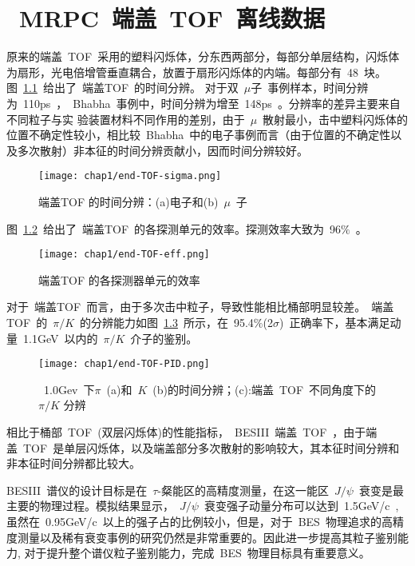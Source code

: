 \chapter{~MRPC~端盖~TOF~离线数据}
原来的端盖~TOF~采用的塑料闪烁体，分东西两部分，每部分单层结构，闪烁体为扇形，光电倍增管垂直耦合，放置于扇形闪烁体的内端。每部分有~48~块。
图~\ref{fig:end-TOF-sigma}~给出了~端盖TOF~的时间分辨。
对于双~$\mu$子~事例样本，时间分辨为~110ps~，~Bhabha~事例中，时间分辨为增至~148ps~\cite{zhaoc:2011}。分辨率的差异主要来自不同粒子与实
验装置材料不同作用的差别，由于~$\mu$~散射最小，击中塑料闪烁体的位置不确定性较小，相比较~Bhabha~中的电子事例而言（由于位置的不确定性以及多次散射）非本征的时间分辨贡献小，因而时间分辨较好。
\begin{figure}[!h]
  \centering
  \texttt{[image: chap1/end-TOF-sigma.png]}
  \caption{端盖TOF 的时间分辨：(a)电子和(b)~$\mu$~子}
  \label{fig:end-TOF-sigma}
\end{figure}
图~\ref{fig:end-TOF-eff}~给出了~端盖TOF~的各探测单元的效率。探测效率大致为~96$\%$~\cite{wangxz2016}。
\begin{figure}[!h]
  \centering
  \texttt{[image: chap1/end-TOF-eff.png]}
  \caption{端盖TOF 的各探测器单元的效率}
  \label{fig:end-TOF-eff}
\end{figure}

对于~端盖TOF~而言，由于多次击中粒子，导致性能相比桶部明显较差。~端盖TOF~的~$\pi/K$~的分辨能力如图~\ref{fig:end-TOF-PID}~\cite{zhaoc:2011}所示，在~95.4$\%$(2$\sigma$)~正确率下，基本满足动量~1.1GeV~以内的~$\pi/K$~介子的鉴别。

\begin{figure}[!h]
  \centering
  \texttt{[image: chap1/end-TOF-PID.png]}
  \caption{~1.0Gev~下$\pi$~(a)和~$K$~(b)的时间分辨；(c):端盖~TOF~不同角度下的$\pi/K$ 分辨}
  \label{fig:end-TOF-PID}
\end{figure}

相比于桶部~TOF~(双层闪烁体)的性能指标，~BESIII~端盖~TOF~，由于端盖~TOF~是单层闪烁体，以及端盖部分多次散射的影响较大，其本征时间分辨和非本征时间分辨都比较大。

BESIII~谱仪的设计目标是在~$\tau$-粲能区的高精度测量，在这一能区~$J/\psi$~衰变是最主要的物理过程。模拟结果显示，~$J/\psi$~衰变强子动量分布可以达到~1.5GeV/c~,虽然在~0.95GeV/c~以上的强子占的比例较小，但是，对于~BES~物理追求的高精度测量以及稀有衰变事例的研究仍然是非常重要的。因此进一步提高其粒子鉴别能力, 对于提升整个谱仪粒子鉴别能力，完成~BES~物理目标具有重要意义。

